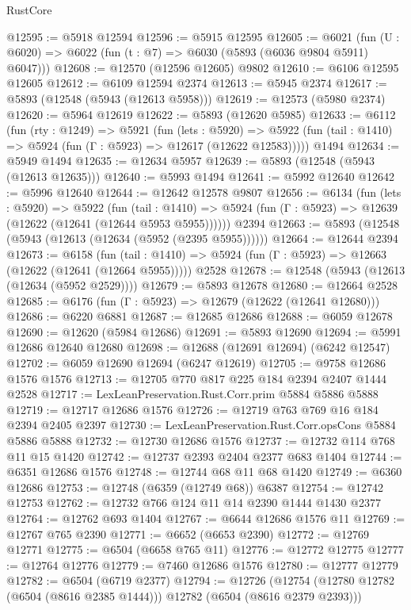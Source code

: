 \begin{lexlean}{RustCore}
\begin{coremodule}
@12595 := @5918 @12594
@12596 := @5915 @12595
@12605 := @6021 (fun (U : @6020) => @6022 (fun (t : @7) => @6030 (@5893 (@6036 @9804 @5911) @6047)))
@12608 := @12570 (@12596 @12605) @9802
@12610 := @6106 @12595 @12605
@12612 := @6109 @12594 @2374
@12613 := @5945 @2374
@12617 := @5893 (@12548 (@5943 (@12613 @5958)))
@12619 := @12573 (@5980 @2374)
@12620 := @5964 @12619
@12622 := @5893 (@12620 @5985)
@12633 := @6112
    (fun (rty : @1249) =>
    @5921
      (fun (lets : @5920) =>
      @5922 (fun (tail : @1410) => @5924 (fun (Γ : @5923) => @12617 (@12622 @12583)))))
    @1494
@12634 := @5949 @1494
@12635 := @12634 @5957
@12639 := @5893 (@12548 (@5943 (@12613 @12635)))
@12640 := @5993 @1494
@12641 := @5992 @12640
@12642 := @5996 @12640
@12644 := @12642 @12578 @9807
@12656 := @6134
    (fun (lets : @5920) =>
    @5922
      (fun (tail : @1410) =>
      @5924 (fun (Γ : @5923) => @12639 (@12622 (@12641 (@12644 @5953 @5955))))))
    @2394
@12663 := @5893 (@12548 (@5943 (@12613 (@12634 (@5952 (@2395 @5955))))))
@12664 := @12644 @2394
@12673 := @6158
    (fun (tail : @1410) => @5924 (fun (Γ : @5923) => @12663 (@12622 (@12641 (@12664 @5955)))))
    @2528
@12678 := @12548 (@5943 (@12613 (@12634 (@5952 @2529))))
@12679 := @5893 @12678
@12680 := @12664 @2528
@12685 := @6176 (fun (Γ : @5923) => @12679 (@12622 (@12641 @12680)))
@12686 := @6220 @6881
@12687 := @12685 @12686
@12688 := @6059 @12678
@12690 := @12620 (@5984 @12686)
@12691 := @5893 @12690
@12694 := @5991 @12686 @12640 @12680
@12698 := @12688 (@12691 @12694) (@6242 @12547)
@12702 := @6059 @12690 @12694 (@6247 @12619)
@12705 := @9758 @12686 @1576 @1576
@12713 := @12705 @770 @817 @225 @184 @2394 @2407 @1444 @2528
@12717 := LexLeanPreservation.Rust.Corr.prim @5884 @5886 @5888
@12719 := @12717 @12686 @1576
@12726 := @12719 @763 @769 @16 @184 @2394 @2405 @2397
@12730 := LexLeanPreservation.Rust.Corr.opsCons @5884 @5886 @5888
@12732 := @12730 @12686 @1576
@12737 := @12732 @114 @768 @11 @15 @1420
@12742 := @12737 @2393 @2404 @2377 @683 @1404
@12744 := @6351 @12686 @1576
@12748 := @12744 @68 @11 @68 @1420
@12749 := @6360 @12686
@12753 := @12748 (@6359 (@12749 @68)) @6387
@12754 := @12742 @12753
@12762 := @12732 @766 @124 @11 @14 @2390 @1444 @1430 @2377
@12764 := @12762 @693 @1404
@12767 := @6644 @12686 @1576 @11
@12769 := @12767 @765 @2390
@12771 := @6652 (@6653 @2390)
@12772 := @12769 @12771
@12775 := @6504 (@6658 @765 @11)
@12776 := @12772 @12775
@12777 := @12764 @12776
@12779 := @7460 @12686 @1576
@12780 := @12777 @12779
@12782 := @6504 (@6719 @2377)
@12794 := @12726
    (@12754 (@12780 @12782 (@6504 (@8616 @2385 @1444))) @12782 (@6504 (@8616 @2379 @2393)))

\end{coremodule}
\end{lexlean}
